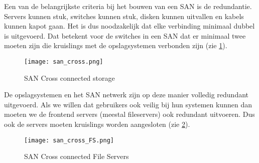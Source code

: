 Een van de belangrijkste criteria bij het bouwen van een SAN is de redundantie. Servers kunnen stuk, switches kunnen stuk, disken kunnen uitvallen en kabels kunnen kapot gaan. Het is dus noodzakelijk dat elke verbinding minimaal dubbel is uitgevoerd. Dat betekent voor de switches in een SAN dat er minimaal twee moeten zijn die kruislings met de opslagsystemen verbonden zijn (zie \ref{SAN_cross}).

\begin{figure}[h!]
	\texttt{[image: san\_cross.png]}
	\caption{SAN Cross connected storage}
	\label{SAN_cross}
\end{figure}

De opslagsystemen en het SAN netwerk zijn op deze manier volledig redundant uitgevoerd. Als we willen dat gebruikers ook veilig bij hun systemen kunnen dan moeten we de frontend servers (meestal fileservers) ook redundant uitvoeren. Dus ook de servers moeten kruislings worden aangesloten (zie \ref{SAN_cross_FS}).

\begin{figure}[h!]
	\texttt{[image: san\_cross\_FS.png]}
	\caption{SAN Cross connected File Servers}
	\label{SAN_cross_FS}
\end{figure}


